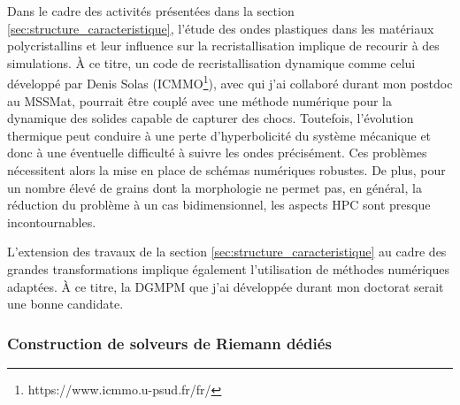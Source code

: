 Dans le cadre des activités présentées dans la section \ref{sec:structure_caracteristique}, l'étude des ondes plastiques dans les matériaux polycristallins et leur influence sur la recristallisation implique de recourir à des simulations.
{\`A} ce titre, un code de recristallisation dynamique comme celui développé par Denis Solas (ICMMO\footnote{https://www.icmmo.u-psud.fr/fr/}), avec qui j'ai collaboré durant mon postdoc au MSSMat, pourrait être couplé avec une méthode numérique pour la dynamique des solides capable de capturer des chocs. 
Toutefois, l'évolution thermique peut conduire à une perte d'hyperbolicité du système mécanique \cite{Truesdell} et donc à une éventuelle difficulté à suivre les ondes précisément. %
Ces problèmes nécessitent alors la mise en place de schémas numériques robustes.
De plus, pour un nombre élevé de grains dont la morphologie ne permet pas, en général, la réduction du problème à un cas bidimensionnel, les aspects HPC sont presque incontournables.

L'extension des travaux de la section \ref{sec:structure_caracteristique} au cadre des grandes transformations implique également l'utilisation de méthodes numériques adaptées.
{\`A} ce titre, la DGMPM que j'ai développée durant mon doctorat serait une bonne candidate.





\subsubsection*{Construction de solveurs de Riemann dédiés}

